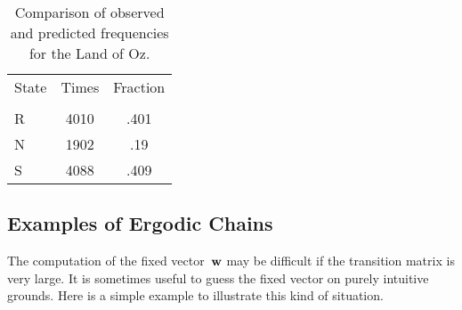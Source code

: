 \begin{example}
\begin{table}[h]
\centering
\begin{tabular}{lcc}
State &      Times     &     Fraction\\
      &                &           \\
R     &      4010      &      .401 \\
N     &      1902      &      .19  \\
S     &      4088      &      .409 \\
\end{tabular}
\caption{Comparison of observed and predicted frequencies for the Land of Oz.}
\label{table 11.3}
\end{table}
\end{example}

\subsection*{Examples of Ergodic Chains}

The computation of the fixed vector~${\mbox{\bf w}\/}$ may be difficult if the
transition matrix is very large.  It is sometimes useful to guess the fixed
vector
on purely intuitive grounds.  Here is a simple example to illustrate this kind
of situation.

